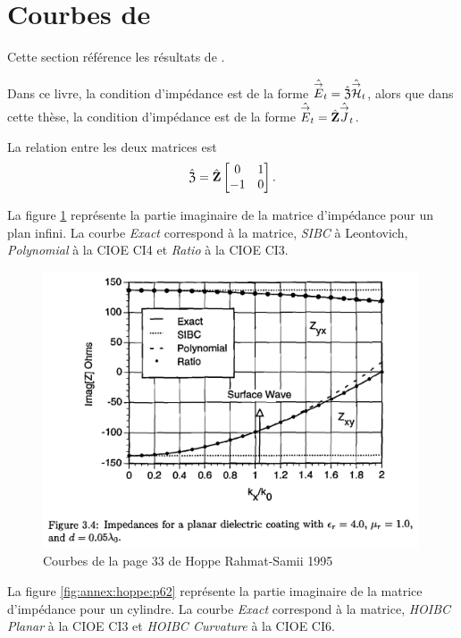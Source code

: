 \section[Courbes de HOPPE 1995]{Courbes de \cite{hoppe_impedance_1995}}
\label{sec:annexe:hoppe}
Cette section référence les résultats de \cite{hoppe_impedance_1995}. 


Dans ce livre, la condition d'impédance est de la forme \(\hat{{\overset{\rightarrow}{E}}}_t = \hat{\mathfrak{Z}} \hat{{\overset{\rightarrow}{\mathcal{H}}}}_t\), alors que dans cette thèse, la condition d'impédance est de la forme \(\hat{{\overset{\rightarrow}{E}}}_t = \hat{\mathbf{Z}} \hat{{\overset{\rightarrow}{J}}}_t\). 

La relation entre les deux matrices est
\begin{equation}
  \hat{\mathfrak{Z}} = \hat{\mathbf{Z}}\begin{bmatrix}0&1\\-1&0\end{bmatrix}.
\end{equation}

La figure \ref{fig:annex:hoppe:p33} représente la partie imaginaire de la matrice d'impédance pour un plan infini. La courbe \textit{Exact} correspond à la matrice, \textit{SIBC} à Leontovich, \textit{Polynomial} à la CIOE CI4 et \textit{Ratio} à la CIOE CI3.

\begin{figure}[h!tb]
    \includegraphics[width=0.99\textwidth]{images/hoppe/p33_imp_cylindre.png}
    \caption{Courbes de la page 33 de Hoppe Rahmat-Samii 1995}
    \label{fig:annex:hoppe:p33}
\end{figure}

La figure \ref{fig:annex:hoppe:p62} représente la partie imaginaire de la matrice d'impédance  pour un cylindre. La courbe \textit{Exact} correspond à la matrice, \textit{HOIBC Planar} à la CIOE CI3 et \textit{HOIBC Curvature} à la CIOE CI6.

